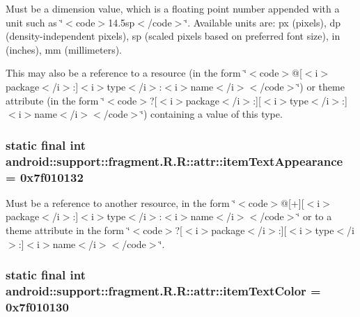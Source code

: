 Must be a dimension value, which is a floating point number appended with a unit such as \char`\"{}$<$code$>$14.5sp$<$/code$>$\char`\"{}. Available units are: px (pixels), dp (density-independent pixels), sp (scaled pixels based on preferred font size), in (inches), mm (millimeters). 

This may also be a reference to a resource (in the form \char`\"{}$<$code$>$@\mbox{[}$<$i$>$package$<$/i$>$:\mbox{]}$<$i$>$type$<$/i$>$:$<$i$>$name$<$/i$>$$<$/code$>$\char`\"{}) or theme attribute (in the form \char`\"{}$<$code$>$?\mbox{[}$<$i$>$package$<$/i$>$:\mbox{]}\mbox{[}$<$i$>$type$<$/i$>$:\mbox{]}$<$i$>$name$<$/i$>$$<$/code$>$\char`\"{}) containing a value of this type. \hypertarget{classandroid_1_1support_1_1fragment_1_1_r_1_1attr_dbdf2093295ffe95db91a7eeec2006dd}{
\subsubsection[{itemTextAppearance}]{\setlength{\rightskip}{0pt plus 5cm}static final int android::support::fragment.R.R::attr::itemTextAppearance = 0x7f010132}}
\label{classandroid_1_1support_1_1fragment_1_1_r_1_1attr_dbdf2093295ffe95db91a7eeec2006dd}


Must be a reference to another resource, in the form \char`\"{}$<$code$>$@\mbox{[}+\mbox{]}\mbox{[}$<$i$>$package$<$/i$>$:\mbox{]}$<$i$>$type$<$/i$>$:$<$i$>$name$<$/i$>$$<$/code$>$\char`\"{} or to a theme attribute in the form \char`\"{}$<$code$>$?\mbox{[}$<$i$>$package$<$/i$>$:\mbox{]}\mbox{[}$<$i$>$type$<$/i$>$:\mbox{]}$<$i$>$name$<$/i$>$$<$/code$>$\char`\"{}. \hypertarget{classandroid_1_1support_1_1fragment_1_1_r_1_1attr_d86a491fe89c6ae18b0a25f130679e24}{
\subsubsection[{itemTextColor}]{\setlength{\rightskip}{0pt plus 5cm}static final int android::support::fragment.R.R::attr::itemTextColor = 0x7f010130}}
\label{classandroid_1_1support_1_1fragment_1_1_r_1_1attr_d86a491fe89c6ae18b0a25f130679e24}


